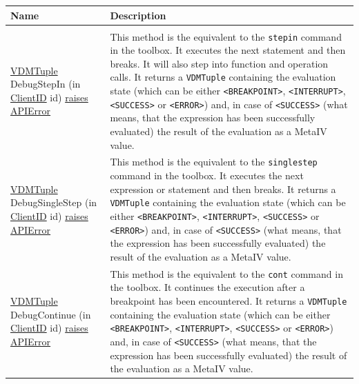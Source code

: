 \documentclass[\pformat,12pt]{article}
\newcommand{\pbs}[1]{\let\temp=\\#1\let\\=\temp}
\newenvironment{interfacetable}{%
  \begin{longtable}{|>{\pbs\raggedright\ttfamily}p{6.6cm}%
                    |>{\pbs\raggedright}p{6.6cm}|} \hline
  \textrm{\bfseries Name} &  \textbf{Description} \\ \hline
  \endhead
  }{\end{longtable}}
\newcommand{\APIError}{\hyperlink{exception.APIError}{raises APIError}}
\newcommand{\ClientID}{\hyperlink{type.ClientID}{ClientID}}
\newcommand{\VDMTuple}{\hyperlink{interface.VDMTuple}{VDMTuple}}
\begin{document}
\begin{interfacetable}
\\ \hline
{\VDMTuple} DebugStepIn (in {\ClientID} id) \APIError 
  & This method is the equivalent to the {\tt stepin} command in the toolbox.
  It executes the next statement and then breaks. It will also step into
  function and operation calls.
  It returns a {\tt VDMTuple} containing the evaluation state (which can be
  either {\tt <BREAKPOINT>}, {\tt <INTERRUPT>}, {\tt <SUCCESS>} or {\tt <ERROR>})
  and, in case of {\tt <SUCCESS>} (what means, that the expression has been
  successfully evaluated)  the result of the evaluation as a MetaIV value.
\\ \hline
{\VDMTuple} DebugSingleStep (in {\ClientID} id) \APIError 
  & This method is the equivalent to the {\tt singlestep} command in the toolbox.
  It executes the next expression or statement and then breaks.
  It returns a {\tt VDMTuple} containing the evaluation state (which can be
  either {\tt <BREAKPOINT>}, {\tt <INTERRUPT>}, {\tt <SUCCESS>} or {\tt <ERROR>})
  and, in case of {\tt <SUCCESS>} (what means, that the expression has been
  successfully evaluated)  the result of the evaluation as a MetaIV value.
\\ \hline
{\VDMTuple} DebugContinue (in {\ClientID} id) \APIError 
  & This method is the equivalent to the {\tt cont} command in the toolbox.
  It continues the execution after a breakpoint has been encountered.
  It returns a {\tt VDMTuple} containing the evaluation state (which can be
  either {\tt <BREAKPOINT>}, {\tt <INTERRUPT>}, {\tt <SUCCESS>} or {\tt <ERROR>})
  and, in case of {\tt <SUCCESS>} (what means, that the expression has been
  successfully evaluated)  the result of the evaluation as a MetaIV value.
\\ \hline

\end{interfacetable}
\end{document}
